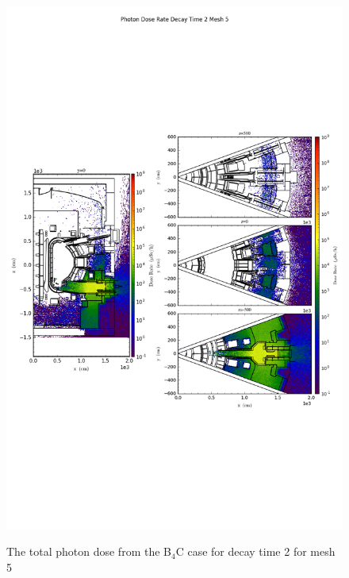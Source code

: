 \begin{figure}[ht!]
\centering
\includegraphics[trim={0cm 9cm 0cm 10cm},clip,scale=0.75]{../plots/final_model_with_b4c/Photon_Dose_Rate_Decay_Time_2_Mesh_5.png}
\label{fig:photons_dc2_no4bc_m5_flux}
\caption{The total photon dose from the B$_4$C case for decay time 2 for mesh 5}
\end{figure}
